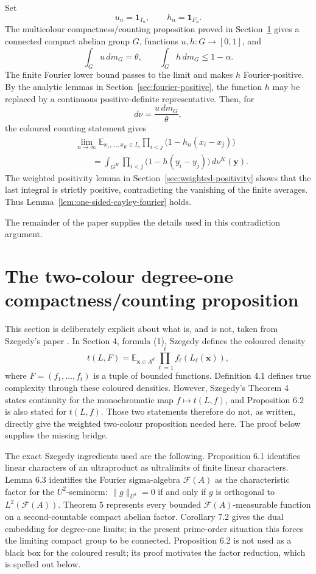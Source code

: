 \documentclass[11pt]{article}
\numberwithin{equation}{section}
\newcommand{\E}{\mathbb E}
\newcommand{\1}{\mathbf 1}
\newcommand{\calF}{\mathcal F}
\begin{document}
Set
\[
        u_n=\1_{I_n},
        \qquad
        h_n=\1_{F_n}.
\]
The multicolour compactness/counting proposition proved in
Section~\ref{sec:compactness} gives a connected compact abelian group
\(G\), functions \(u,h:G\to[0,1]\), and
\[
        \int_G u\,dm_G=\theta,
        \qquad
        \int_G h\,dm_G\le1-\alpha.
\]
The finite Fourier lower bound passes to the limit and makes \(h\)
Fourier-positive.  By the analytic lemmas in Section~\ref{sec:fourier-positive},
the function \(h\) may be replaced by a continuous positive-definite representative.
Then, for
\[
        d\nu=\frac{u\,dm_G}{\theta},
\]
the coloured counting statement gives
\[
\begin{aligned}
&\lim_{n\to\infty}
\E_{x_1,\ldots,x_K\in I_n}
\prod_{i<j}\bigl(1-h_n(x_i-x_j)\bigr)                                      \\
&\qquad =
\int_{G^K}
\prod_{i<j}\bigl(1-h(y_i-y_j)\bigr)\,d\nu^K(\mathbf y).
\end{aligned}
\]
The weighted positivity lemma in Section~\ref{sec:weighted-positivity}
shows that the last integral is strictly positive, contradicting the
vanishing of the finite averages.  Thus
Lemma~\ref{lem:one-sided-cayley-fourier} holds.

The remainder of the paper supplies the details used in this contradiction
argument.

\section{The two-colour degree-one compactness/counting proposition}
\label{sec:compactness}

This section is deliberately explicit about what is, and is not, taken
from Szegedy's paper \cite{SzegedyLimits}.  In Section 4, formula (1),
Szegedy defines the coloured density
\[
        t(L,F)
        =
        \E_{\mathbf x\in A^d}
        \prod_{\ell=1}^t f_\ell(L_\ell(\mathbf x)),
\]
where \(F=(f_1,\ldots,f_t)\) is a tuple of bounded functions.  Definition
4.1 defines true complexity through these coloured densities.  However,
Szegedy's Theorem 4 states continuity for the monochromatic map
\(f\mapsto t(L,f)\), and Proposition 6.2 is also stated for \(t(L,f)\).
Those two statements therefore do not, as written, directly give the
weighted two-colour proposition needed here.  The proof below supplies the
missing bridge.

The exact Szegedy ingredients used are the following.  Proposition 6.1
identifies linear characters of an ultraproduct as ultralimits of finite
linear characters.  Lemma 6.3 identifies the Fourier sigma-algebra
\(\calF(A)\) as the characteristic factor for the \(U^2\)-seminorm:
\(\|g\|_{U^2}=0\) if and only if \(g\) is orthogonal to
\(L^2(\calF(A))\).  Theorem 5 represents every bounded
\(\calF(A)\)-measurable function on a second-countable compact abelian
factor.  Corollary 7.2 gives the dual embedding for degree-one limits; in
the present prime-order situation this forces the limiting compact group
to be connected.  Proposition 6.2 is not used as a black box for the
coloured result; its proof motivates the factor reduction, which is spelled
out below.
\end{document}
